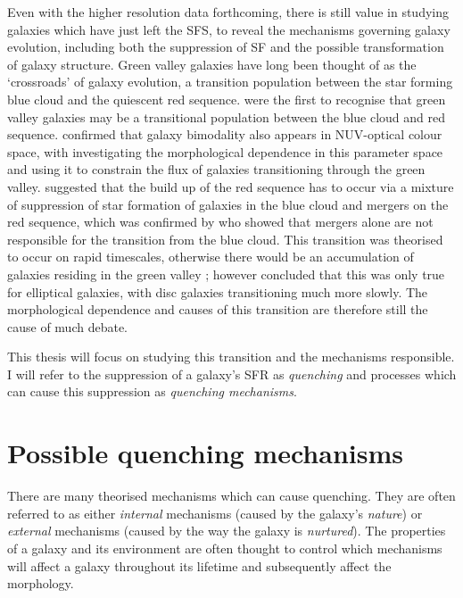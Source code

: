 Even with the higher resolution data forthcoming, there is still value in studying galaxies which have just left the SFS, to reveal the mechanisms governing galaxy evolution, including both the suppression of SF and the possible transformation of galaxy structure. Green valley galaxies have long been thought of as the `crossroads' of galaxy evolution, a transition population between the star forming blue cloud and the quiescent red sequence. \citet{Bell04} were the first to recognise that green valley galaxies may be a transitional population between the blue cloud and red sequence. \citet{Wyder07} confirmed that galaxy bimodality also appears in NUV-optical colour space, with \citet{Schim07} investigating the morphological dependence in this parameter space and \citet{Martin07} using it to constrain the flux of galaxies transitioning through the green valley. \citet{Faber07} suggested that the build up of the red sequence has to occur via a mixture of suppression of star formation of galaxies in the blue cloud and mergers on the red sequence, which was confirmed by \citet{Mendez11} who showed that mergers alone are not responsible for the transition from the blue cloud. This transition was theorised to occur on rapid timescales, otherwise there would be an accumulation of galaxies residing in the green valley \citep{Gonc12}; however \citet{schawinski14} concluded that this was only true for elliptical galaxies, with disc galaxies transitioning much more slowly. The morphological dependence and causes of this transition are therefore still the cause of much debate. 


This thesis will focus on studying this transition and the mechanisms responsible. I will refer to the suppression of a galaxy's SFR as \emph{quenching} and processes which can cause this suppression as \emph{quenching mechanisms}. 

\section{Possible quenching mechanisms}\label{sec:quenchmech}

There are many theorised mechanisms which can cause quenching. They are often referred to as either \emph{internal} mechanisms (caused by the galaxy's \emph{nature}) or \emph{external} mechanisms (caused by the way the galaxy is \emph{nurtured}). The properties of a galaxy and its environment are often thought to control which mechanisms will affect a galaxy throughout its lifetime and subsequently affect the morphology. 

